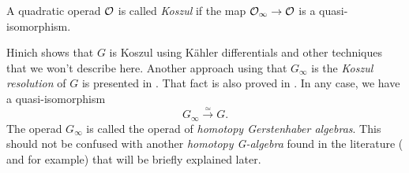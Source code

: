 \documentclass[TFM.tex]{subfiles}
\begin{document}
\begin{defi}
A quadratic operad ${\mathcal O}$ is called \emph{Koszul} if the map ${\mathcal O}_\infty\to {\mathcal O}$ is a quasi-isomorphism.
\end{defi}

Hinich \cite{Hinich} shows that $G$ is Koszul using Kähler differentials and other techniques that we won't describe here. Another approach using that $G_\infty$ is the \emph{Koszul resolution} of $G$ is presented in \cite{AlgebraicOperads}. That fact is also proved in \cite{GJ}. In any case, we have a  quasi-isomorphism %
\begin{equation}\label{equivalence}
G_\infty\xrightarrow{\simeq} G.
\end{equation}
The operad $G_\infty$ is called the operad of \emph{homotopy Gerstenhaber algebras}. This should not be confused with another \emph{homotopy G-algebra} found in the literature (\cite{VO} and \cite{VGH} for example) that will be briefly explained later. 


%






\end{document}
